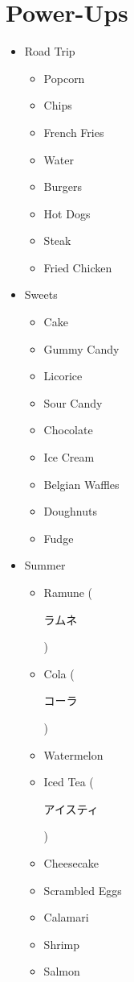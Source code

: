 \documentclass[12pt]{article}
\begin{document}
\section{Power-Ups}
\begin{multicols}{2}
\begin{itemize}[noitemsep]
\item Road Trip
\begin{itemize}[noitemsep,nosep]
\item Popcorn
\item Chips
\item French Fries
\item Water
\item Burgers
\item Hot Dogs
\item Steak
\item Fried Chicken
\end{itemize}
\item Sweets
\begin{itemize}[noitemsep,nosep]
\item Cake
\item Gummy Candy
\item Licorice
\item Sour Candy
\item Chocolate
\item Ice Cream
\item Belgian Waffles
\item Doughnuts
\item Fudge
\end{itemize}
\item Summer
\begin{itemize}[noitemsep,nosep]
\item Ramune (\begin{CJK}{UTF8}{min}ラムネ\end{CJK})
\item Cola (\begin{CJK}{UTF8}{min}コーラ\end{CJK})
\item Watermelon
\item Iced Tea (\begin{CJK}{UTF8}{min}アイスティ\end{CJK})
\item Cheesecake
\item Scrambled Eggs
\item Calamari
\item Shrimp
\item Salmon
\end{itemize}

\end{itemize}
\end{multicols}
\end{document}
